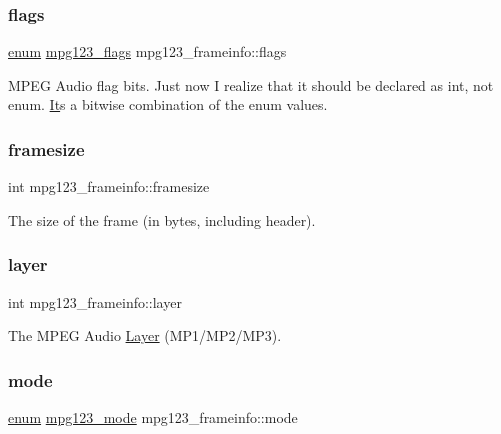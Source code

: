 \subsubsection{\texorpdfstring{flags}{flags}}
{\footnotesize\ttfamily \hyperlink{interfaceenum}{enum} \hyperlink{group__mpg123__status_gaf527c5a99203cb8591b0e0dfb2615303}{mpg123\+\_\+flags} mpg123\+\_\+frameinfo\+::flags}

M\+P\+EG Audio flag bits. Just now I realize that it should be declared as int, not enum. \hyperlink{class_it}{It}\textquotesingle{}s a bitwise combination of the enum values. \mbox{\label{structmpg123__frameinfo_a8846bf9e4d0f9246bf04a4d00254fce9}} 
\subsubsection{\texorpdfstring{framesize}{framesize}}
{\footnotesize\ttfamily int mpg123\+\_\+frameinfo\+::framesize}

The size of the frame (in bytes, including header). \mbox{\label{structmpg123__frameinfo_a23b3cad377729431a601cff6dd227ee2}} 
\subsubsection{\texorpdfstring{layer}{layer}}
{\footnotesize\ttfamily int mpg123\+\_\+frameinfo\+::layer}

The M\+P\+EG Audio \hyperlink{struct_layer}{Layer} (M\+P1/\+M\+P2/\+M\+P3). \mbox{\label{structmpg123__frameinfo_a2d4adb8ca9bd6dc0de36c8dca3fe531d}} 
\subsubsection{\texorpdfstring{mode}{mode}}
{\footnotesize\ttfamily \hyperlink{interfaceenum}{enum} \hyperlink{group__mpg123__status_ga044931724a9a987a86c2eea02f85cc4b}{mpg123\+\_\+mode} mpg123\+\_\+frameinfo\+::mode}

